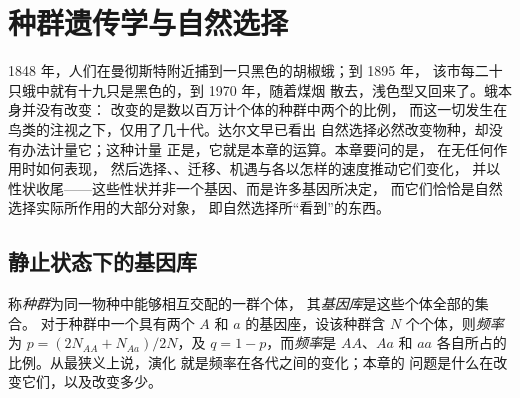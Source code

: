 \chapter{种群遗传学与自然选择}\label{ch:b2:population-genetics}

1848 年，人们在曼彻斯特附近捕到一只黑色的胡椒蛾；到 1895 年，
该市每二十只蛾中就有十九只是黑色的，到 1970 年，随着煤烟
散去，浅色型又回来了。蛾本身并没有改变：
改变的是数以百万计个体的种群中两个的比例，
而这一切发生在鸟类的注视之下，仅用了几十代。达尔文早已看出
自然选择必然改变物种，却没有办法计量它；这种计量
正是，它就是本章的运算。本章要问的是，
在无任何作用时如何表现，
然后选择、、迁移、机遇与各以怎样的速度推动它们变化，
并以性状收尾——这些性状并非一个基因、而是许多基因所决定，
而它们恰恰是自然选择实际所作用的大部分对象，
即自然选择所“看到”的东西。

\section{静止状态下的基因库}

\begin{definition}[种群、基因库、频率]\label{def:b2:population-genetics:frequencies}
称\emph{种群}为同一物种中能够相互交配的一群个体，
其\emph{基因库}是这些个体全部的集合。
对于种群中一个具有两个 $A$ 和 $a$ 的基因座，设该种群含
$N$ 个个体，则\emph{频率}为 $p = (2N_{AA} +
N_{Aa})/2N$，及 $q = 1 - p$，而\emph{频率}是
$AA$、$Aa$ 和 $aa$ 各自所占的比例。从最狭义上说，演化
就是频率在各代之间的变化；本章的
问题是什么在改变它们，以及改变多少。
\end{definition}

